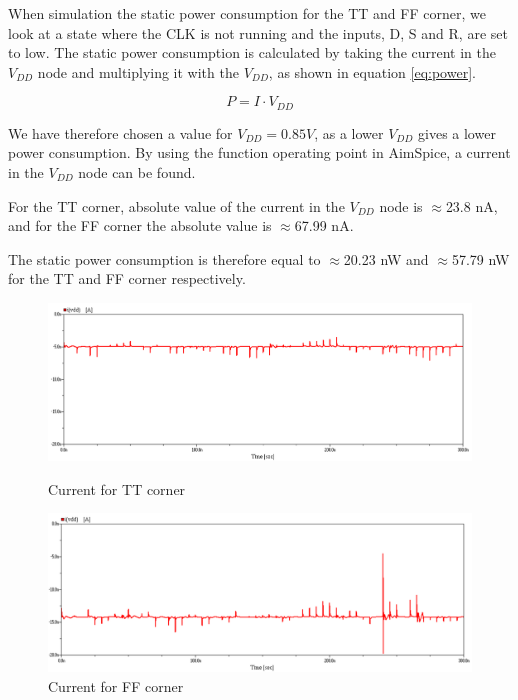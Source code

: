 When simulation the static power consumption for the TT and FF corner, we look at a state where the CLK is not running and the inputs, D, S and R, are set to low. The static power consumption is calculated by taking the current in the $V_{DD}$ node and multiplying it with the $V_{DD}$, as shown in equation \ref{eq:power}.

\begin{equation}
    \label{eq:power}
    P = I \cdot V_{DD}
\end{equation}

We have therefore chosen a value for $V_{DD} = 0.85V$, as a lower $V_{DD}$ gives a lower power consumption. By using the function operating point in AimSpice, a current in the $V_{DD}$ node can be found.  

For the TT corner, absolute value of the current in the $V_{DD}$ node is $\approx$23.8 nA, and for the FF corner the absolute value is $\approx$67.99 nA.

The static power consumption is therefore equal to $\approx$20.23 nW and $\approx$57.79 nW for the TT and FF corner respectively.

\begin{figure}[H]
\begin{minipage}{0.5\textwidth}
    \centering
    \includegraphics[width=\linewidth]{Figures/Current_VDD_TT.png}
    \caption{Current for TT corner}
    \label{fig:currentTT}
\end{minipage}
\begin{minipage}{0.5\textwidth}
    \centering
    \includegraphics[width=\linewidth]{Figures/Current_VDD_FF.png}
    \caption{Current for FF corner}
    \label{fig:currentFF}
\end{minipage}
\end{figure}

